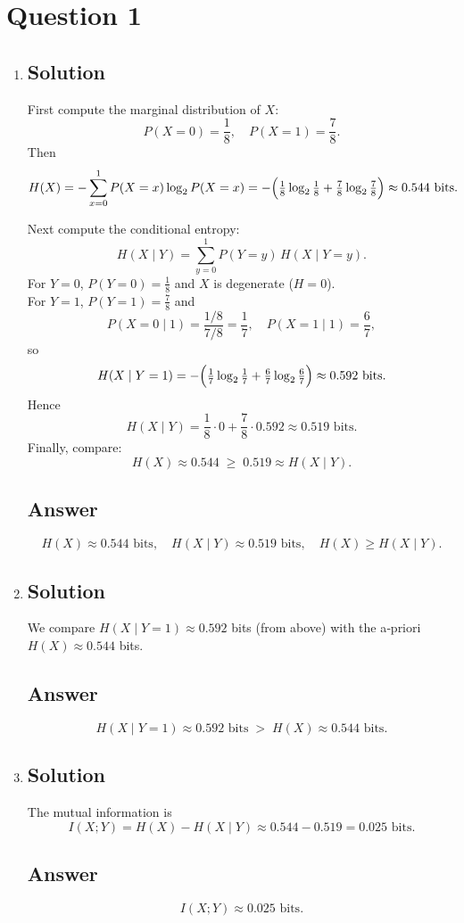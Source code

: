 \documentclass[12pt]{article}
\begin{document}
	
	\section*{Question 1}
	
	\noindent 
	
	\bigskip
	
	\begin{enumerate}[start=1,label={\bfseries Part \arabic*:},leftmargin=0in]
		\bigskip\item 
		
		\subsection*{Solution}
		First compute the marginal distribution of $X$:
		\[
		P(X=0)=\frac18,\quad P(X=1)=\frac78.
		\]
		Then
		\[
		H(X)=-\sum_{x=0}^1 P(X=x)\log_2P(X=x)
		=-\Bigl(\tfrac18\log_2\tfrac18+\tfrac78\log_2\tfrac78\Bigr)
		\approx0.544\text{ bits}.
		\]
		
		Next compute the conditional entropy:
		\[
		H(X\mid Y)
		=\sum_{y=0}^1P(Y=y)\,H(X\mid Y=y).
		\]
		For $Y=0$, $P(Y=0)=\tfrac18$ and $X$ is degenerate ($H=0$).\\
		For $Y=1$, $P(Y=1)=\tfrac78$ and
		\[
		P(X=0\mid1)=\frac{1/8}{7/8}=\frac17,\quad
		P(X=1\mid1)=\frac67,
		\]
		so
		\[
		H(X\mid Y=1)
		=-\Bigl(\tfrac17\log_2\tfrac17+\tfrac67\log_2\tfrac67\Bigr)
		\approx0.592\text{ bits}.
		\]
		Hence
		\[
		H(X\mid Y)
		=\frac18\cdot0+\frac78\cdot0.592
		\approx0.519\text{ bits}.
		\]
		Finally, compare:
		\[
		H(X)\approx0.544\;\ge\;0.519\approx H(X\mid Y).
		\]
		
		\subsection*{Answer}
		\[
		\boxed{
			H(X)\approx0.544\text{ bits},\quad
			H(X\mid Y)\approx0.519\text{ bits},\quad
			H(X)\ge H(X\mid Y).}
		\]
		
		\bigskip\item 
		
		\subsection*{Solution}
		We compare $H(X\mid Y=1)\approx0.592$ bits (from above) with the a‐priori $H(X)\approx0.544$ bits. 
		
		\subsection*{Answer}
		\[
		\boxed{
			H(X\mid Y=1)\approx0.592\text{ bits}
			\;>\;
			H(X)\approx0.544\text{ bits}.
		}
		\]
		
		\bigskip\item 
		
		\subsection*{Solution}
		The mutual information is
		\[
		I(X;Y)=H(X)-H(X\mid Y)
		\approx0.544-0.519=0.025\text{ bits}.
		\]
		
		\subsection*{Answer}
		\[
		\boxed{I(X;Y)\approx0.025\text{ bits}.}
		\]
	\end{enumerate}
	
\end{document}
